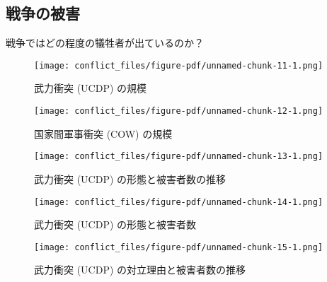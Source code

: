 \documentclass[
  xelatex,
  ja=standard]{bxjsarticle}
\begin{document}
\hypertarget{ux6226ux4e89ux306eux88abux5bb3}{%
\subsection{戦争の被害}\label{ux6226ux4e89ux306eux88abux5bb3}}

戦争ではどの程度の犠牲者が出ているのか？

\begin{figure}[htpb]

{\centering \texttt{[image: conflict\_files/figure-pdf/unnamed-chunk-11-1.png]}

}

\caption{武力衝突 (UCDP) の規模}

\end{figure}

\begin{figure}[htpb]

{\centering \texttt{[image: conflict\_files/figure-pdf/unnamed-chunk-12-1.png]}

}

\caption{国家間軍事衝突 (COW) の規模}

\end{figure}

\begin{figure}[htpb]

{\centering \texttt{[image: conflict\_files/figure-pdf/unnamed-chunk-13-1.png]}

}

\caption{武力衝突 (UCDP) の形態と被害者数の推移}

\end{figure}

\begin{figure}[htpb]

{\centering \texttt{[image: conflict\_files/figure-pdf/unnamed-chunk-14-1.png]}

}

\caption{武力衝突 (UCDP) の形態と被害者数}

\end{figure}

\begin{figure}[htpb]

{\centering \texttt{[image: conflict\_files/figure-pdf/unnamed-chunk-15-1.png]}

}

\caption{武力衝突 (UCDP) の対立理由と被害者数の推移}

\end{figure}
\end{document}
